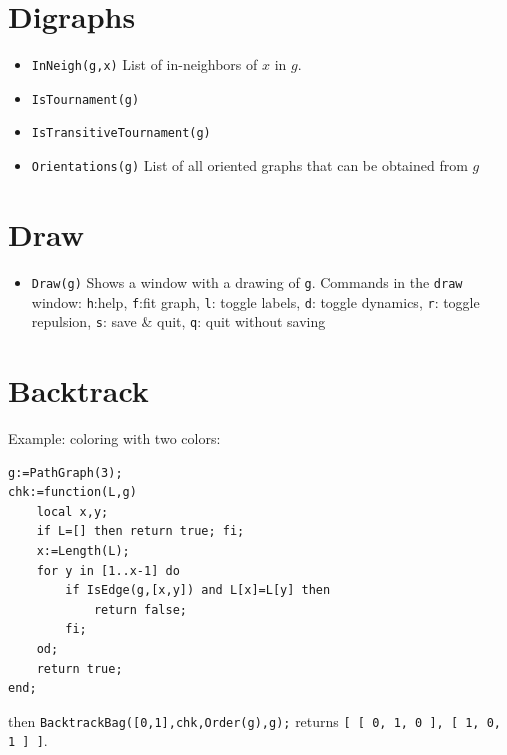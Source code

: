 \documentclass[11pt]{article}
\begin{document}
\begin{multicols}{3}
\section{Digraphs}
\label{sec:org96a06ef}

\begin{itemize}
\item \texttt{InNeigh(g,x)} List of in-neighbors of \(x\) in \(g\).
\item \texttt{IsTournament(g)}
\item \texttt{IsTransitiveTournament(g)}
\item \texttt{Orientations(g)} List of all oriented graphs that can be obtained
from \(g\)
\end{itemize}

\section{Draw}
\label{sec:org63a6375}
\begin{itemize}
\item \texttt{Draw(g)} Shows a window with a drawing of \texttt{g}. Commands in the \texttt{draw} window: \texttt{h}:help, \texttt{f}:fit graph,
\texttt{l}: toggle labels, \texttt{d}: toggle dynamics, \texttt{r}: toggle repulsion, \texttt{s}: save \& quit, \texttt{q}:
quit without saving
\end{itemize}

\section{Backtrack}
\label{sec:org384859e}

Example: coloring with two colors:
\begin{lstlisting}
g:=PathGraph(3);
chk:=function(L,g)
    local x,y;
    if L=[] then return true; fi;
    x:=Length(L);
    for y in [1..x-1] do
        if IsEdge(g,[x,y]) and L[x]=L[y] then
            return false;
        fi;
    od;
    return true;
end;
\end{lstlisting}
then \texttt{BacktrackBag([0,1],chk,Order(g),g);} returns \texttt{[ [ 0, 1, 0 ], [
  1, 0, 1 ] ]}. 


\end{multicols}
\end{document}

